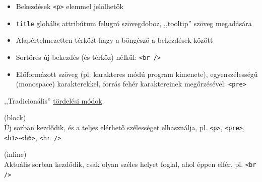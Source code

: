 \documentclass[usenames,dvipsnames,aspectratio=169]{beamer}
\newcommand{\hiv}[1]{{\color{hivatkozasszin}#1}}
\begin{document}
\begin{frame}
  \begin{itemize}
    \item Bekezdések \texttt{<p>} elemmel jelölhetők
    \item \texttt{title} globális attribútum felugró szövegdoboz, ,,tooltip'' szöveg megadására
    \item Alapértelmezetten térközt hagy a böngésző a bekezdések között
    \item Sortörés új bekezdés (és térköz) nélkül: \texttt{<br />}
    \item Előformázott szöveg (pl. karakteres módú program kimenete), egyenszélességű (monospace) karakterekkel, forrás fehér karaktereinek megőrzésével: \texttt{<pre>}
  \end{itemize}
  \vfill
  ,,Tradicionális'' \hiv{\href{https://developer.mozilla.org/en-US/docs/Web/HTML/Block-level_elements}{tördelési módok}}
  \begin{description}[m]
    \item[Blokkszintű] (block) \hfill \\ Új sorban kezdődik, és a teljes elérhető szélességet elhasználja, pl. \texttt{<p>}, \texttt{<pre>}, \texttt{<h1>}-\texttt{<h6>}, \texttt{<hr />}
    \item[Soron belüli] (inline) \hfill \\ Aktuális sorban kezdődik, csak olyan széles helyet foglal, ahol éppen elfér, pl. \texttt{<br />}
  \end{description}
\end{frame}
\end{document}
